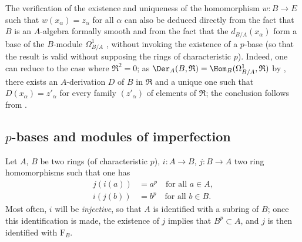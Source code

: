 \begin{remark}[21.2.8]
\label{0.21.2.8}
The verification of the existence and uniqueness of the homomorphism $w:B\to E$ such that $w(x_\alpha)=z_\alpha$ for all $\alpha$ can also be deduced directly from the fact that $B$ is an $A$-algebra formally smooth and from the fact that the $d_{B/A}(x_\alpha)$ form a base of the $B$-module $\Omega^1_{B/A}$ , without invoking the existence of a $p$-base (so that the result is valid without supposing the rings of characteristic $p$).
Indeed, one can reduce to the case where $\mathfrak{R}^2=0$; as $\Der_A(B,\mathfrak{R})=\Hom_B(\Omega^1_{B/A},\mathfrak{R})$ by , there exists an $A$-derivation $D$ of $B$ in $\mathfrak{R}$ and a unique one such that $D(x_\alpha)=z'_\alpha$ for every family $(z'_\alpha)$ of elements of $\mathfrak{R}$; the conclusion follows from .
\end{remark}

\subsection{\texorpdfstring{$p$}{p}-bases and modules of imperfection}
\label{subsection:0.21.3}

\begin{env}[21.3.1]
\label{0.21.3.1}
Let $A$, $B$ be two rings (of characteristic $p$), $i:A\to B$, $j:B\to A$ two ring homomorphisms such that one has
\begin{align}
\tag{21.3.1.1}
  \label{0.21.3.1.1}
  j(i(a))&=a^p \quad\text{for all } a\in A, \\
\tag{21.3.1.2}
  \label{0.21.3.1.2}
  i(j(b))&=b^p \quad\text{for all } b\in B.
\end{align}
Most often, $i$ will be \emph{injective}, so that $A$ is identified with a subring of $B$; once this identification is made, the existence of $j$ implies that $B^p\subset A$, and $j$ is then identified with $\mathrm{F}_B$.
\end{env}

